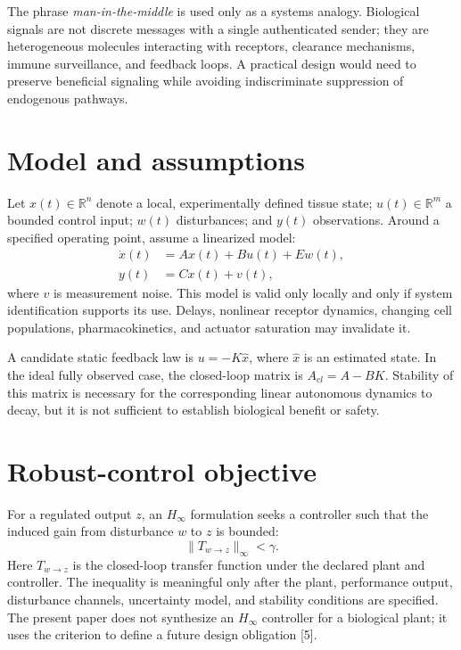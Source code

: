 \documentclass[11pt]{article}
\begin{document}
The phrase \emph{man-in-the-middle} is used only as a systems analogy. Biological signals are not discrete messages with a single authenticated sender; they are heterogeneous molecules interacting with receptors, clearance mechanisms, immune surveillance, and feedback loops. A practical design would need to preserve beneficial signaling while avoiding indiscriminate suppression of endogenous pathways.

\section{Model and assumptions}
Let $x(t)\in\mathbb{R}^n$ denote a local, experimentally defined tissue state; $u(t)\in\mathbb{R}^m$ a bounded control input; $w(t)$ disturbances; and $y(t)$ observations. Around a specified operating point, assume a linearized model:
\begin{align}
\dot{x}(t)&=Ax(t)+Bu(t)+Ew(t),\label{eq:plant}\\
y(t)&=Cx(t)+v(t),\label{eq:measurement}
\end{align}
where $v$ is measurement noise. This model is valid only locally and only if system identification supports its use. Delays, nonlinear receptor dynamics, changing cell populations, pharmacokinetics, and actuator saturation may invalidate it.

A candidate static feedback law is $u=-K\hat{x}$, where $\hat{x}$ is an estimated state. In the ideal fully observed case, the closed-loop matrix is $A_{cl}=A-BK$. Stability of this matrix is necessary for the corresponding linear autonomous dynamics to decay, but it is not sufficient to establish biological benefit or safety.

\section{Robust-control objective}
For a regulated output $z$, an $H_\infty$ formulation seeks a controller such that the induced gain from disturbance $w$ to $z$ is bounded:
\begin{equation}
\|T_{w\to z}\|_\infty < \gamma.\label{eq:hinf}
\end{equation}
Here $T_{w\to z}$ is the closed-loop transfer function under the declared plant and controller. The inequality is meaningful only after the plant, performance output, disturbance channels, uncertainty model, and stability conditions are specified. The present paper does not synthesize an $H_\infty$ controller for a biological plant; it uses the criterion to define a future design obligation [5].
\end{document}
